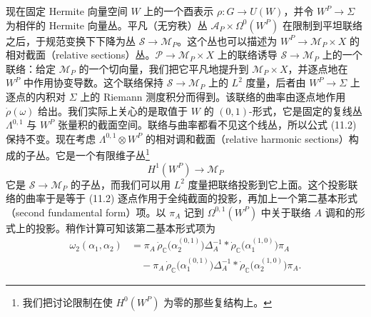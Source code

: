 现在固定 Hermite 向量空间 $W$ 上的一个酉表示 $\rho:G\to U(W)$，并令 $W^P\to\Sigma$ 为相伴的 Hermite 向量丛。平凡（无穷秩）丛 $\mathcal{A}_P\times\Omega^0(W^P)$ 在限制到平坦联络之后，于规范变换下下降为丛 $\mathcal{S}\to\mathcal{M}_P$。这个丛也可以描述为 $W^P\to\mathcal{M}_P\times X$ 的相对截面（relative sections）丛。$\mathcal{P}\to\mathcal{M}_P\times X$ 上的联络诱导 $\mathcal{S}\to\mathcal{M}_P$ 上的一个联络：给定 $\mathcal{M}_P$ 的一个切向量，我们把它平凡地提升到 $\mathcal{M}_P\times X$，并逐点地在 $W^P$ 中作用协变导数。这个联络保持 $\mathcal{S}\to\mathcal{M}_P$ 上的 $L^2$ 度量，后者由 $W^P\to\Sigma$ 上逐点的内积对 $\Sigma$ 上的 Riemann 测度积分而得到。该联络的曲率由逐点地作用 $\dot\rho(\omega)$ 给出。我们实际上关心的是取值于 $W$ 的 $(0,1)$-形式，它是固定的复线丛 $\Lambda^{0,1}$ 与 $W^P$ 张量积的截面空间。联络与曲率都看不见这个线丛，所以公式 (11.2) 保持不变。现在考虑 $\Lambda^{0,1}\otimes W^P$ 的相对调和截面（relative harmonic sections）构成的子丛。它是一个有限维子丛\footnote{%
我们把讨论限制在使 $H^0(W^P)$ 为零的那些复结构上。}
\begin{equation}
  \tag{11.3}
  \label{eq:sol11-3}
  H^1(W^P)\to\mathcal{M}_P
\end{equation}
它是 $\mathcal{S}\to\mathcal{M}_P$ 的子丛，而我们可以用 $L^2$ 度量把联络投影到它上面。这个投影联络的曲率于是等于 (11.2) 逐点作用于全纯截面的投影，再加上一个第二基本形式（second fundamental form）项。以 $\pi_A$ 记到 $\Omega^{0,1}(W^P)$ 中关于联络 $A$ 调和的形式上的投影。稍作计算可知该第二基本形式项为
\begin{equation}
  \tag{11.4}
  \label{eq:sol11-4}
  \begin{aligned}
    \omega_2(\alpha_1,\alpha_2)
    &=\pi_A\,\dot\rho_{\mathbb{C}}\bigl(\alpha_2^{(0,1)}\bigr)\Delta_A^{-1}*\dot\rho_{\mathbb{C}}\bigl(\alpha_1^{(1,0)}\bigr)\pi_A\\
    &\quad-\pi_A\,\dot\rho_{\mathbb{C}}\bigl(\alpha_1^{(0,1)}\bigr)\Delta_A^{-1}*\dot\rho_{\mathbb{C}}\bigl(\alpha_2^{(1,0)}\bigr)\pi_A.
  \end{aligned}
\end{equation}


